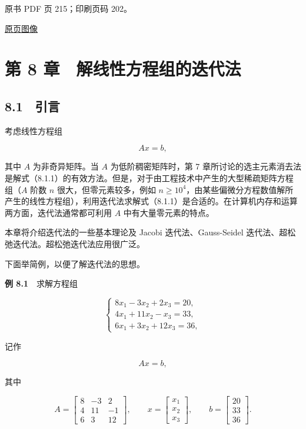 \clearpage

原书 PDF 页 215；印刷页码 202。

\href{source-images/pdf-215.jpeg}{原页图像}

\section{第 8 章　解线性方程组的迭代法}\label{ch08-ux7b2c-8-ux7ae0-ux89e3ux7ebfux6027ux65b9ux7a0bux7ec4ux7684ux8fedux4ee3ux6cd5}

\subsection{8.1　引言}\label{ch08-ux5f15ux8a00}

考虑线性方程组

\[
Ax=b,
\tag{8.1.1}
\]

其中 \(A\) 为非奇异矩阵。当 \(A\) 为低阶稠密矩阵时，第 7 章所讨论的选主元素消去法是解式（8.1.1）的有效方法。但是，对于由工程技术中产生的大型稀疏矩阵方程组（\(A\) 阶数 \(n\) 很大，但零元素较多，例如 \(n\geqslant10^4\)，由某些偏微分方程数值解所产生的线性方程组），利用迭代法求解式（8.1.1）是合适的。在计算机内存和运算两方面，迭代法通常都可利用 \(A\) 中有大量零元素的特点。

本章将介绍迭代法的一些基本理论及 Jacobi 迭代法、Gauss-Seidel 迭代法、超松弛迭代法。超松弛迭代法应用很广泛。

下面举简例，以便了解迭代法的思想。

\textbf{例 8.1}　求解方程组

\[
\begin{cases}
8x_1-3x_2+2x_3=20,\\
4x_1+11x_2-x_3=33,\\
6x_1+3x_2+12x_3=36,
\end{cases}
\tag{8.1.2}
\]

记作

\[
Ax=b,
\]

其中

\[
A=\begin{bmatrix}8&-3&2\\4&11&-1\\6&3&12\end{bmatrix},\qquad
x=\begin{bmatrix}x_1\\x_2\\x_3\end{bmatrix},\qquad
b=\begin{bmatrix}20\\33\\36\end{bmatrix}.
\]

